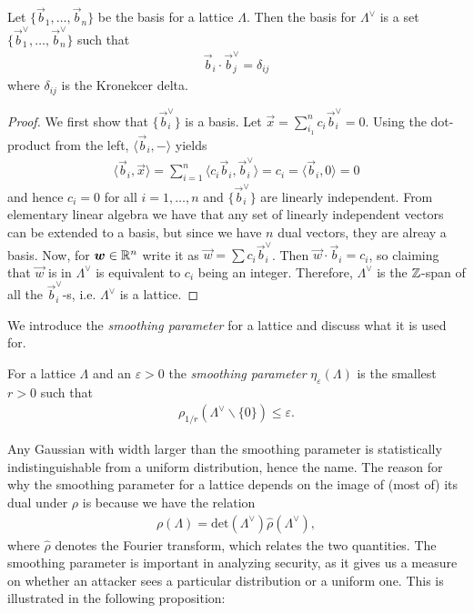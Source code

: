     \begin{proposition}
    \label{Prop: Dual Lattice Basis}
        Let \(\{\vec{b}_1,\dots ,\vec{b}_n\}\) be the basis for a lattice \(\Lambda\). Then the basis for \(\Lambda^\vee\) is a  set \(\{\vec{b}_1^\vee, \dots ,\vec{b}_n^\vee\}\) such that 
        \begin{align*}
            \vec{b}_i\cdot\vec{b}_j^\vee = \delta_{ij}
        \end{align*}
        where \(\delta_{ij}\) is the Kronekcer delta.
    \end{proposition}
    \begin{proof}
        We first show that \(\{\vec{b}_i^\vee\}\) is a basis. Let \(\vec{x} = \sum_{i_1}^n c_i \vec{b}_i^\vee = 0\). Using the dot-product from the left, \(\langle \vec{b}_i, -\rangle\) yields
        \begin{align*}
            \langle \vec{b}_i, \vec{x}\rangle = \sum\limits_{i = 1}^n \langle c_i\vec{b}_i, \vec{b}_i^\vee\rangle = c_i = \langle \vec{b}_i, 0\rangle = 0 
        \end{align*}
        and hence \(c_i = 0\) for all \(i = 1, \dots , n\) and \(\{\vec{b}_i^\vee\}\) are linearly independent. From elementary linear algebra we have that any set of linearly independent vectors can be extended to a basis, but since we have \(n\) dual vectors, they are alreay a basis. Now, for \(\boldsymbol{w}\in\mathbb{R}^n\) write it as \(\vec{w} = \sum c_i\vec{b}_i^\vee\). Then \(\vec{w}\cdot\vec{b}_i = c_i\), so claiming that \(\vec{w}\) is in \(\Lambda^\vee\) is equivalent to \(c_i\) being an integer. Therefore, \(\Lambda^\vee\) is the \(\mathbb{Z}\)-span of all the \(\vec{b}_i^\vee\)-s, i.e. \(\Lambda^\vee\) is a lattice.
    \end{proof}
    We introduce the \emph{smoothing parameter} for a lattice and discuss what it is used for.
    \begin{definition}
        For a lattice \(\Lambda\) and an \(\varepsilon > 0\) the \emph{smoothing parameter} \(\eta_{\varepsilon}(\Lambda)\) is the smallest \(r > 0\) such that
        \begin{align*}
            \rho_{1/r}(\Lambda^\vee\backslash\{ 0 \}) \leq \varepsilon.
        \end{align*}
    \end{definition}
    Any Gaussian with width larger than the smoothing parameter is statistically indistinguishable from a uniform distribution, hence the name. The reason for why the smoothing parameter for a lattice depends on the image of (most of) its dual under \(\rho\) is because we have the relation\cite{Smoothing Parameter Proof}
    \begin{align*}
        \rho(\Lambda) = \text{det}(\Lambda^\vee)\hat{\rho}(\Lambda^\vee),
    \end{align*}
    where \(\hat{\rho}\) denotes the Fourier transform, which relates the two quantities. The smoothing parameter is important in analyzing security, as it gives us a measure on whether an attacker sees a particular distribution or a uniform one. This is illustrated in the following proposition:
    
